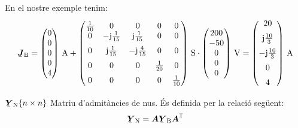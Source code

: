 \begin{list}{}
   En el nostre exemple tenim:
   \[
      \mcmplx{J}\ped{B} =
      \begin{pmatrix} 0 \\ 0 \\ 0 \\ 0 \\ 4 \end{pmatrix}\,\unit{A} +
       \begin{pmatrix}
            \frac{1}{10} & 0 & 0 & 0 & 0 \\
            0 & -\ju\frac{1}{15} & \ju\frac{1}{15} & 0 & 0 \\[2mm]
            0 & \ju\frac{1}{15} & -\ju\frac{4}{15} & 0 & 0 \\[2mm]
            0 & 0 & 0 & \frac{1}{20} & 0 \\[2mm]
            0 & 0 & 0 & 0 & \frac{1}{10}
      \end{pmatrix}\,\unit{S} \cdot
      \begin{pmatrix} 200 \\ -50 \\ 0 \\ 0 \\ 0 \end{pmatrix}\,\unit{V} =
      \begin{pmatrix}
            20 \\[2mm]
             \ju \frac{10}{3} \\[2mm]
             -\ju \frac{10}{3} \\[2mm]
             0 \\[2mm]
              4
      \end{pmatrix}\,\unit{A}
   \]

   \item[$\mcmplx{Y}\ped{N}\{n\times n\}$] Matriu d'admitàncies de nus. És definida per la relació següent:
   \begin{equation}
      \mcmplx{Y}\ped{N} = \boldsymbol{A} \mcmplx{Y}\ped{B}
      \transp{\boldsymbol{A}}
   \end{equation}


\end{list}

